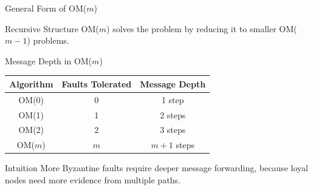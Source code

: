 \documentclass[aspectratio=169]{beamer}
\begin{document}
\begin{frame}{General Form of OM($m$)}

\begin{center}
\end{center}

\begin{block}{Recursive Structure}
OM($m$) solves the problem by reducing it to smaller OM($m-1$) problems.
\end{block}

\end{frame}

\begin{frame}{Message Depth in OM($m$)}

\begin{table}
\centering
\begin{tabular}{ccc}
\toprule
Algorithm & Faults Tolerated & Message Depth \\
\midrule
OM(0) & 0 & 1 step \\
OM(1) & 1 & 2 steps \\
OM(2) & 2 & 3 steps \\
OM($m$) & $m$ & $m+1$ steps \\
\bottomrule
\end{tabular}
\end{table}

\vspace{0.4cm}

\begin{block}{Intuition}
More Byzantine faults require deeper message forwarding, because loyal nodes need more evidence from multiple paths.
\end{block}

\end{frame}
\end{document}
